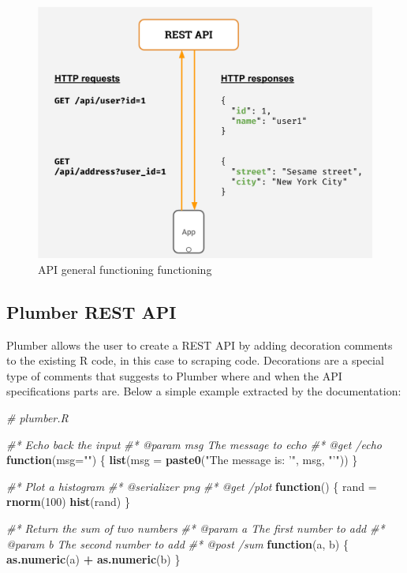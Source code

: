 \documentclass[
  12pt,
  a4paper,
  oneside]{book}
\newenvironment{Shaded}{\begin{snugshade}}{\end{snugshade}}
\newcommand{\CommentTok}[1]{\textcolor[rgb]{0.56,0.35,0.01}{\textit{#1}}}
\newcommand{\ControlFlowTok}[1]{\textcolor[rgb]{0.13,0.29,0.53}{\textbf{#1}}}
\newcommand{\DataTypeTok}[1]{\textcolor[rgb]{0.13,0.29,0.53}{#1}}
\newcommand{\DecValTok}[1]{\textcolor[rgb]{0.00,0.00,0.81}{#1}}
\newcommand{\KeywordTok}[1]{\textcolor[rgb]{0.13,0.29,0.53}{\textbf{#1}}}
\newcommand{\NormalTok}[1]{#1}
\newcommand{\OperatorTok}[1]{\textcolor[rgb]{0.81,0.36,0.00}{\textbf{#1}}}
\newcommand{\StringTok}[1]{\textcolor[rgb]{0.31,0.60,0.02}{#1}}
\theoremstyle{definition}
\theoremstyle{definition}
\theoremstyle{definition}
\theoremstyle{remark}
\begin{document}
\begin{figure}
\centering
\includegraphics{images/Rest-API.png}
\caption{API general functioning functioning}
\end{figure}

\hypertarget{plumberapi}{%
\subsection{Plumber REST API}\label{plumberapi}}

Plumber allows the user to create a REST API by adding decoration comments to the existing R code, in this case to scraping code. Decorations are a special type of comments that suggests to Plumber where and when the API specifications parts are. Below a simple example extracted by the documentation:

\begin{Shaded}
\begin{Highlighting}[]
\CommentTok{# plumber.R}

\CommentTok{#* Echo back the input}
\CommentTok{#* @param msg The message to echo}
\CommentTok{#* @get /echo}
\ControlFlowTok{function}\NormalTok{(}\DataTypeTok{msg=}\StringTok{""}\NormalTok{) \{}
  \KeywordTok{list}\NormalTok{(}\DataTypeTok{msg =} \KeywordTok{paste0}\NormalTok{(}\StringTok{"The message is: '"}\NormalTok{, msg, }\StringTok{"'"}\NormalTok{))}
\NormalTok{\}}

\CommentTok{#* Plot a histogram}
\CommentTok{#* @serializer png}
\CommentTok{#* @get /plot}
\ControlFlowTok{function}\NormalTok{() \{}
\NormalTok{  rand =}\StringTok{ }\KeywordTok{rnorm}\NormalTok{(}\DecValTok{100}\NormalTok{)}
  \KeywordTok{hist}\NormalTok{(rand)}
\NormalTok{\}}

\CommentTok{#* Return the sum of two numbers}
\CommentTok{#* @param a The first number to add}
\CommentTok{#* @param b The second number to add}
\CommentTok{#* @post /sum}
\ControlFlowTok{function}\NormalTok{(a, b) \{}
  \KeywordTok{as.numeric}\NormalTok{(a) }\OperatorTok{+}\StringTok{ }\KeywordTok{as.numeric}\NormalTok{(b)}
\NormalTok{\}}
\end{Highlighting}
\end{Shaded}
\end{document}
